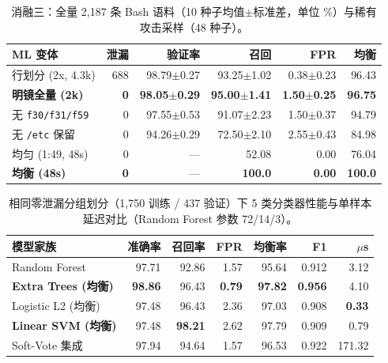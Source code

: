 \documentclass[UTF8,a4paper,zihao=-4,twocolumn]{ctexart}
\newcommand{\code}[1]{\texttt{\small #1}}
\begin{document}
\begin{table}[t]
\centering
\scriptsize
\setlength{\tabcolsep}{1.1pt}
\caption{消融三：全量 2,187 条 Bash 语料（10 种子均值$\pm$标准差，单位 \%）与稀有攻击采样（48 种子）。}
\label{tab:ablation_ml_zh}
\begin{tabular}{@{}lrrrrr@{}}
\toprule
\textbf{ML 变体} & \textbf{泄漏} & \textbf{验证率} & \textbf{召回} & \textbf{FPR} & \textbf{均衡} \\
\midrule
行划分 (2x, 4.3k)      & 688 & 98.79$\pm$0.27 & 93.25$\pm$1.02 & 0.38$\pm$0.23 & 96.43 \\
\textbf{明镜全量 (2k)} & \textbf{0} & \textbf{98.05$\pm$0.29} & \textbf{95.00$\pm$1.41} & \textbf{1.50$\pm$0.25} & \textbf{96.75} \\
无 \code{f30/f31/f59}  & 0   & 97.55$\pm$0.53 & 91.07$\pm$2.23 & 1.50$\pm$0.37 & 94.79 \\
无 \code{/etc} 保留    & 0   & 94.26$\pm$0.29 & 72.50$\pm$2.10 & 2.55$\pm$0.43 & 84.98 \\
\midrule
均匀 (1:49, 48s)       & 0   & ---            & 52.08          & 0.00          & 76.04 \\
\textbf{均衡 (48s)}    & \textbf{0} & ---     & \textbf{100.0} & \textbf{0.00} & \textbf{100.0} \\
\bottomrule
\end{tabular}
\end{table}

\begin{table}[t]
\centering
\scriptsize
\setlength{\tabcolsep}{1.3pt}
\caption{相同零泄漏分组划分（1,750 训练 / 437 验证）下 5 类分类器性能与单样本延迟对比（Random Forest 参数 72/14/3）。}
\label{tab:ablation_multimodel_zh}
\begin{tabular}{@{}lrrrrrr@{}}
\toprule
\textbf{模型家族} & \textbf{准确率} & \textbf{召回率} & \textbf{FPR} & \textbf{均衡率} & \textbf{F1} & \textbf{$\mu$s} \\
\midrule
Random Forest           & 97.71 & 92.86 & 1.57 & 95.64 & 0.912 & 3.12 \\
\textbf{Extra Trees (均衡)} & \textbf{98.86} & 96.43 & \textbf{0.79} & \textbf{97.82} & \textbf{0.956} & 4.10 \\
Logistic L2 (均衡)      & 97.48 & 96.43 & 2.36 & 97.03 & 0.908 & \textbf{0.33} \\
\textbf{Linear SVM (均衡)}& 97.48 & \textbf{98.21} & 2.62 & 97.79 & 0.909 & 0.79 \\
Soft-Vote 集成          & 97.94 & 94.64 & 1.57 & 96.53 & 0.922 & 171.32 \\
\bottomrule
\end{tabular}
\end{table}
\end{document}
